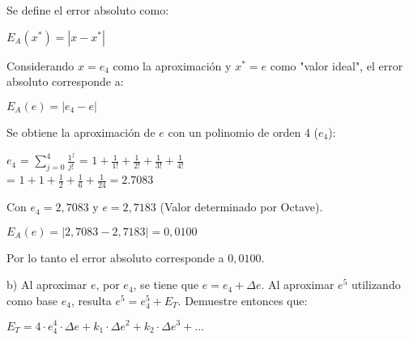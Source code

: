 \documentclass[]{article}
\begin{document}
\begin{flushleft}
	 Se define el error absoluto como:
\end{flushleft}

\begin{center}
	$E_{A} (x^{*}) = |x-x^{*}|$
\end{center} 

\begin{flushleft}
			Considerando $x = e_{4}$ como la aproximación y $x^{*} = e$ como "valor ideal",  el error absoluto corresponde a:
\end{flushleft}

\begin{center} $E_{A} (e) = |e_{4}-e|$ \\
\end{center}

\begin{flushleft}
	Se obtiene la aproximación de $e$ con un polinomio de orden 4 ($e_{4}$):
\end{flushleft}

\begin{center}
	$e_{4}$ = $\displaystyle\sum_{j=0}^{4} \displaystyle\frac{1^{j}}{j!}$ = $1 + \displaystyle\frac1{1!} + \displaystyle\frac1{2!} + \displaystyle\frac1{3!} + \displaystyle\frac1{4!}$ \\ 
	= $1 + 1 + \displaystyle\frac1{2} + \displaystyle\frac1{6} + \displaystyle\frac1{24} = 2.7083$	
\end{center}

\begin{flushleft}
Con $e_{4} = 2,7083$ y $e = 2,7183$ (Valor determinado por Octave). 
\end{flushleft}

\begin{center} $E_{A} (e) = |2,7083-2,7183| = 0,0100 $	
\end{center}

\begin{flushleft}
	Por lo tanto el  error absoluto corresponde a $0,0100$.\\
\end{flushleft}


\begin{flushleft}
	b) Al aproximar $e$, por $e_{4}$, se tiene que $e = e_{4} + \Delta e$. Al aproximar $e^{5}$ utilizando como base $e_{4}$, resulta $e^{5} = e_{4}^5 + E_{T}$. Demuestre entonces que:
\end{flushleft}

\begin{center} $E_{T} = 4 \cdot e_{4}^4 \cdot \Delta e + k_{1} \cdot \Delta {e}^2 + k_{2} \cdot \Delta e^{3} + ...$ 
\end{center} 
\end{document}
